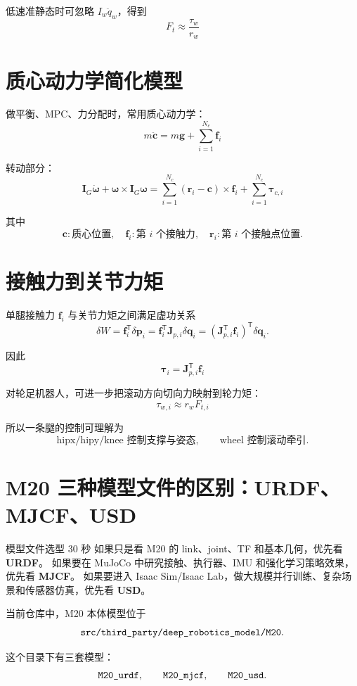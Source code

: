 \documentclass[UTF8,11pt,a4paper]{ctexart}
\newcommand{\T}{^{\mathsf T}}
\newcommand{\bs}[1]{\bm{#1}}
\begin{document}
低速准静态时可忽略 \(I_w\ddot q_w\)，得到
\[
\boxed{
F_t\approx \frac{\tau_w}{r_w}
}
\]

\section{质心动力学简化模型}

做平衡、MPC、力分配时，常用质心动力学：
\[
\boxed{
m\ddot{\bs c}
=
m\bs g+\sum_{i=1}^{N_c}\bs f_i
}
\]

转动部分：
\[
\boxed{
\bs I_G\dot{\bs \omega}
+\bs \omega\times \bs I_G\bs \omega
=
\sum_{i=1}^{N_c}
(\bs r_i-\bs c)\times \bs f_i
+\sum_{i=1}^{N_c}\bs \tau_{c,i}
}
\]

其中
\[
\bs c:\text{质心位置},\quad
\bs f_i:\text{第 }i\text{ 个接触力},\quad
\bs r_i:\text{第 }i\text{ 个接触点位置}.
\]

\section{接触力到关节力矩}

单腿接触力 \(\bs f_i\) 与关节力矩之间满足虚功关系
\[
\delta W
=
\bs f_i\T \delta \bs p_i
=
\bs f_i\T\bs J_{p,i}\delta \bs q_i
=
(\bs J_{p,i}\T\bs f_i)\T\delta\bs q_i.
\]

因此
\[
\boxed{
\bs \tau_i
=
\bs J_{p,i}\T\bs f_i
}
\]

对轮足机器人，可进一步把滚动方向切向力映射到轮力矩：
\[
\boxed{
\tau_{w,i}
\approx
r_w F_{t,i}
}
\]

所以一条腿的控制可理解为
\[
\text{hipx/hipy/knee 控制支撑与姿态},
\qquad
\text{wheel 控制滚动牵引}.
\]

\section{M20 三种模型文件的区别：URDF、MJCF、USD}

\begin{orangebox}{模型文件选型 30 秒}
如果只是看 M20 的 link、joint、TF 和基本几何，优先看 \textbf{URDF}。
如果要在 MuJoCo 中研究接触、执行器、IMU 和强化学习策略效果，优先看 \textbf{MJCF}。
如果要进入 Isaac Sim/Isaac Lab，做大规模并行训练、复杂场景和传感器仿真，优先看 \textbf{USD}。
\end{orangebox}

当前仓库中，M20 本体模型位于
\[
\text{\texttt{src/third\_party/deep\_robotics\_model/M20}}.
\]

这个目录下有三套模型：
\[
\text{\texttt{M20\_urdf}},\qquad
\text{\texttt{M20\_mjcf}},\qquad
\text{\texttt{M20\_usd}}.
\]
\end{document}
